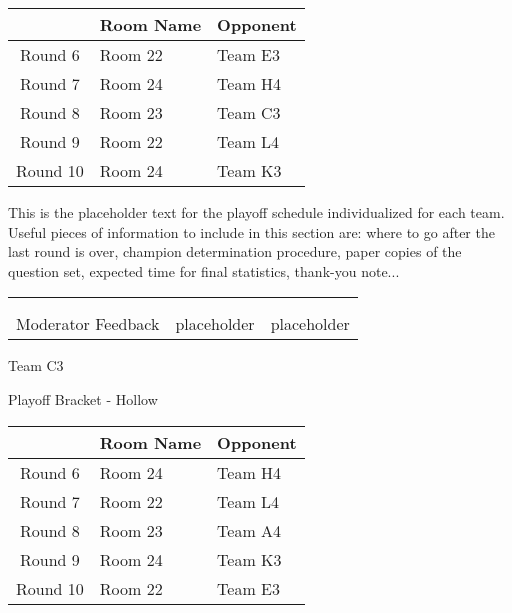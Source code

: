 \documentclass{article}%
\begin{document}
\vspace*{4pt}%
%
\begin{tabularx}{\textwidth}{|c|Y|Y|}%
\hline%
&Room Name&Opponent\\%
\hline%
Round 6&Room 22&Team E3\\%
Round 7&Room 24&Team H4\\%
Round 8&Room 23&Team C3\\%
Round 9&Room 22&Team L4\\%
Round 10&Room 24&Team K3\\%
\hline%
\end{tabularx}%
\vspace*{30pt}%
\linebreak%
This is the placeholder text for the playoff schedule individualized for each team. Useful pieces of information to include in this section are: where to go after the last round is over, champion determination procedure, paper copies of the question set, expected time for final statistics, thank{-}you note...%
\vspace*{30pt}%
\newline%
%
\begin{tabularx}{\textwidth}{YYY}%
  &  &  \\%
\\%
Moderator Feedback&placeholder&placeholder\\%
\end{tabularx}%
\newpage%
\begin{center}%
\begin{Huge}%
Team C3%
\end{Huge}%
\vspace*{12pt}%
\linebreak%
\begin{Large}%
Playoff Bracket {-} Hollow%
\end{Large}%
\end{center}%
\vspace*{4pt}%
%
\begin{tabularx}{\textwidth}{|c|Y|Y|}%
\hline%
&Room Name&Opponent\\%
\hline%
Round 6&Room 24&Team H4\\%
Round 7&Room 22&Team L4\\%
Round 8&Room 23&Team A4\\%
Round 9&Room 24&Team K3\\%
Round 10&Room 22&Team E3\\%
\hline%
\end{tabularx}%
\end{document}
